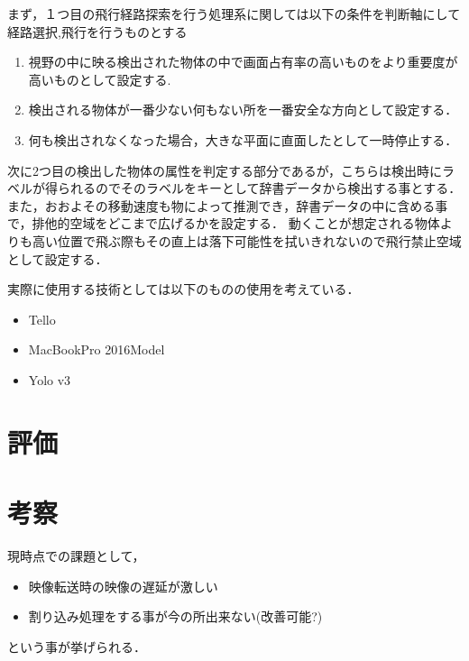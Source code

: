\documentclass[uplatex,a4j,10pt]{jsarticle}
\begin{document}
まず，１つ目の飛行経路探索を行う処理系に関しては以下の条件を判断軸にして経路選択,飛行を行うものとする

\begin{enumerate}
\item 視野の中に映る検出された物体の中で画面占有率の高いものをより重要度が高いものとして設定する.
\item 検出される物体が一番少ない何もない所を一番安全な方向として設定する．
\item 何も検出されなくなった場合，大きな平面に直面したとして一時停止する．
\end{enumerate}

次に2つ目の検出した物体の属性を判定する部分であるが，こちらは検出時にラベルが得られるのでそのラベルをキーとして辞書データから検出する事とする．
また，おおよその移動速度も物によって推測でき，辞書データの中に含める事で，排他的空域をどこまで広げるかを設定する．
動くことが想定される物体よりも高い位置で飛ぶ際もその直上は落下可能性を拭いきれないので飛行禁止空域として設定する．

実際に使用する技術としては以下のものの使用を考えている．
\begin{itemize}
\item Tello
\item MacBookPro 2016Model
\item Yolo v3
\end{itemize}


\section{評価}

\section{考察}
現時点での課題として，
\begin{itemize}
\item 映像転送時の映像の遅延が激しい
\item 割り込み処理をする事が今の所出来ない(改善可能?) 
\end{itemize}
という事が挙げられる．
\end{document}
